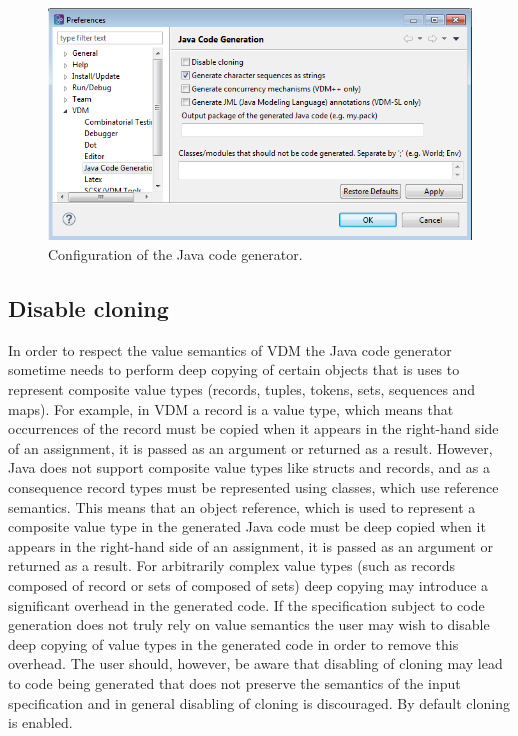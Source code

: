 \begin{figure}[htbp]
\begin{center}
\includegraphics[width=13cm]{screenDumps/javacg_config}
\caption{Configuration of the Java code generator.\label{fig:javacg_config}}
\end{center}
\end{figure}

\subsection{Disable cloning}

In order to respect the value semantics of VDM the Java code generator
sometime needs to perform deep copying of certain objects that is uses
to represent composite value types (records, tuples, tokens, sets,
sequences and maps). For example, in VDM a record is a value type,
which means that occurrences of the record must be copied when it
appears in the right-hand side of an assignment, it is passed as an
argument or returned as a result. However, Java does not support
composite value types like structs and records, and as a consequence
record types must be represented using classes, which use reference
semantics. This means that an object reference, which is used to
represent a composite value type in the generated Java code must be
deep copied when it appears in the right-hand side of an assignment,
it is passed as an argument or returned as a result. For arbitrarily
complex value types (such as records composed of record or sets of
composed of sets) deep copying may introduce a significant overhead in
the generated code. If the specification subject to code generation
does not truly rely on value semantics the user may wish to disable
deep copying of value types in the generated code in order to remove
this overhead. The user should, however, be aware that disabling of
cloning may lead to code being generated that does not preserve the
semantics of the input specification and in general disabling of
cloning is discouraged. By default cloning is enabled.

